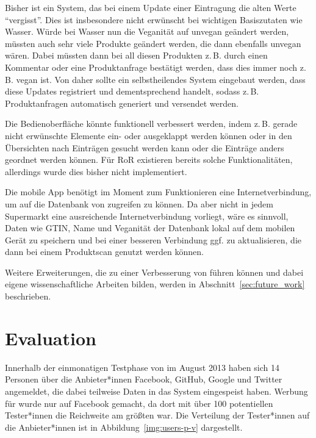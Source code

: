 Bisher ist \name ein System, das bei einem Update einer Eintragung die alten 
Werte "`vergisst"'. Dies ist insbesondere nicht erwünscht bei wichtigen 
Basiszutaten wie Wasser. Würde bei Wasser nun die Veganität auf unvegan 
geändert werden, müssten auch sehr viele Produkte geändert werden, die dann 
ebenfalls unvegan wären. Dabei müssten dann bei all diesen Produkten z.\,B. 
durch einen Kommentar oder eine Produktanfrage bestätigt werden, dass dies 
immer noch z.\,B. vegan ist.
Von daher sollte ein selbstheilendes System eingebaut werden, dass diese 
Updates registriert und dementsprechend handelt, sodass z.\,B. Produktanfragen 
automatisch generiert und versendet werden.

Die Bedienoberfläche könnte funktionell verbessert werden, indem z.\,B. gerade 
nicht erwünschte Elemente ein- oder ausgeklappt werden können oder in den 
Übersichten nach Einträgen gesucht werden kann oder die Einträge anders 
geordnet werden können. Für \ac{RoR} existieren bereits solche 
Funktionalitäten, allerdings wurde dies bisher nicht implementiert.

Die mobile App benötigt im Moment zum Funktionieren eine Internetverbindung, um 
auf die Datenbank von \name zugreifen zu können. Da aber nicht in jedem 
Supermarkt eine ausreichende Internetverbindung vorliegt, wäre es sinnvoll, 
Daten wie \ac{GTIN}, Name und Veganität der Datenbank lokal auf dem mobilen 
Gerät zu speichern und bei einer besseren Verbindung ggf. zu aktualisieren, die 
dann bei einem Produktscan genutzt werden können.

Weitere Erweiterungen, die zu einer Verbesserung von \name führen können und 
dabei eigene wissenschaftliche Arbeiten bilden, werden in 
Abschnitt~\ref{sec:future_work} beschrieben.

\clearpage
\section{Evaluation}
\label{sec:evaluation}

Innerhalb der einmonatigen Testphase von \name im August 2013 haben sich 14 
Personen über die Anbieter*innen Facebook, GitHub, 
Google und Twitter angemeldet, die
dabei teilweise Daten in das System eingespeist haben.
Werbung für \name wurde nur auf Facebook gemacht, da dort mit über 100 
potentiellen Tester*innen die Reichweite am größten war.
Die Verteilung der Tester*innen auf die Anbieter*innen ist in
Abbildung~\ref{img:users-p-v} dargestellt.

